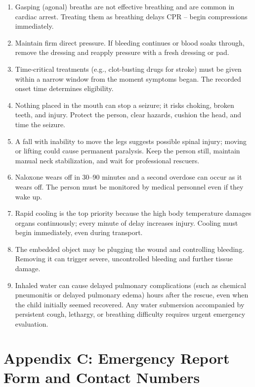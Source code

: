 \begin{enumerate}[leftmargin=*]
\item Gasping (agonal) breaths are not effective breathing and are common in cardiac arrest. Treating them as breathing delays CPR -- begin compressions immediately.
\item Maintain firm direct pressure. If bleeding continues or blood soaks through, remove the dressing and reapply pressure with a fresh dressing or pad.
\item Time-critical treatments (e.g., clot-busting drugs for stroke) must be given within a narrow window from the moment symptoms began. The recorded onset time determines eligibility.
\item Nothing placed in the mouth can stop a seizure; it risks choking, broken teeth, and injury. Protect the person, clear hazards, cushion the head, and time the seizure.
\item A fall with inability to move the legs suggests possible spinal injury; moving or lifting could cause permanent paralysis. Keep the person still, maintain manual neck stabilization, and wait for professional rescuers.
\item Naloxone wears off in 30--90 minutes and a second overdose can occur as it wears off. The person must be monitored by medical personnel even if they wake up.
\item Rapid cooling is the top priority because the high body temperature damages organs continuously; every minute of delay increases injury. Cooling must begin immediately, even during transport.
\item The embedded object may be plugging the wound and controlling bleeding. Removing it can trigger severe, uncontrolled bleeding and further tissue damage.
\item Inhaled water can cause delayed pulmonary complications (such as chemical pneumonitis or delayed pulmonary edema) hours after the rescue, even when the child initially seemed recovered. Any water submersion accompanied by persistent cough, lethargy, or breathing difficulty requires urgent emergency evaluation.
\end{enumerate}

\section*{Appendix C: Emergency Report Form and Contact Numbers}

